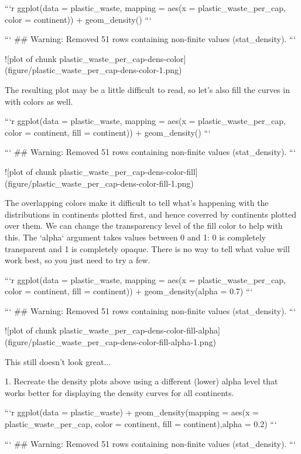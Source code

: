```r
ggplot(data = plastic_waste, 
       mapping = aes(x = plastic_waste_per_cap, 
                     color = continent)) +
  geom_density()
```

```
## Warning: Removed 51 rows containing non-finite values (stat_density).
```

![plot of chunk plastic_waste_per_cap-dens-color](figure/plastic_waste_per_cap-dens-color-1.png)

The resulting plot may be a little difficult to read, so let's also fill the curves in with colors as well.


```r
ggplot(data = plastic_waste, 
       mapping = aes(x = plastic_waste_per_cap, 
                     color = continent, 
                     fill = continent)) +
  geom_density()
```

```
## Warning: Removed 51 rows containing non-finite values (stat_density).
```

![plot of chunk plastic_waste_per_cap-dens-color-fill](figure/plastic_waste_per_cap-dens-color-fill-1.png)

The overlapping colors make it difficult to tell what's happening with the distributions in continents plotted first, and hence coverred by continents plotted over them. We can change the transparency level of the fill color to help with this. The `alpha` argument takes values between 0 and 1: 0 is completely transparent and 1 is completely opaque. There is no way to tell what value will work best, so you just need to try a few.


```r
ggplot(data = plastic_waste, 
       mapping = aes(x = plastic_waste_per_cap, 
                     color = continent, 
                     fill = continent)) +
  geom_density(alpha = 0.7)
```

```
## Warning: Removed 51 rows containing non-finite values (stat_density).
```

![plot of chunk plastic_waste_per_cap-dens-color-fill-alpha](figure/plastic_waste_per_cap-dens-color-fill-alpha-1.png)

This still doesn't look great...

1. Recreate the density plots above using a different (lower) alpha level that works better for displaying the density curves for all continents.


```r
ggplot(data = plastic_waste) +
  geom_density(mapping = aes(x = plastic_waste_per_cap, 
                     color = continent, 
                     fill = continent),alpha = 0.2)
```

```
## Warning: Removed 51 rows containing non-finite values (stat_density).
```

